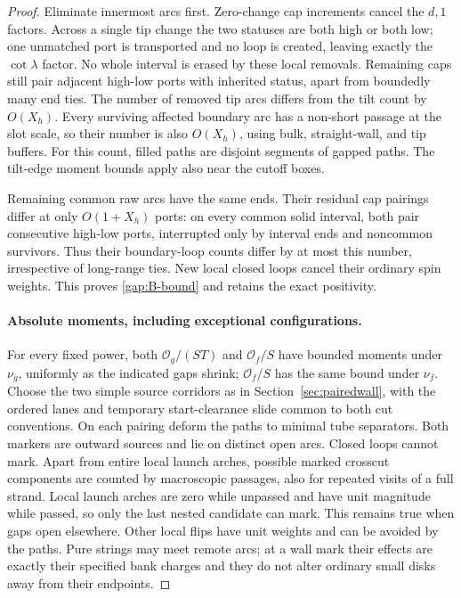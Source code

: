 \begin{proof}
Eliminate innermost arcs first.  Zero-change cap increments cancel the
$d,1$ factors.  Across a single tip change the two statuses are both
high or both low; one unmatched port is transported and no loop is
created, leaving exactly the $\cot\lambda$ factor.  No whole interval
is erased by these local removals.  Remaining caps still pair adjacent
high-low ports with inherited status, apart from boundedly many end
ties.  The number of removed tip arcs differs from the tilt count by
$O(X_h)$.  Every surviving affected boundary arc has a non-short
passage at the slot scale, so their number is also $O(X_h)$, using
bulk, straight-wall, and tip buffers.  For this count, filled paths
are disjoint segments of gapped paths.  The tilt-edge moment bounds
apply also near the cutoff boxes.

Remaining common raw arcs have the same ends.  Their residual cap
pairings differ at only $O(1+X_h)$ ports: on every common solid
interval, both pair consecutive high-low ports, interrupted only by
interval ends and noncommon survivors.  Thus their boundary-loop
counts differ by at most this number, irrespective of long-range
ties.  New local closed loops cancel their ordinary spin weights.
This proves \eqref{gap:B-bound} and retains the exact positivity.

\paragraph{Absolute moments, including exceptional configurations.}
For every fixed power, both $\mathcal O_g/(ST)$ and $\mathcal O_f/S$
have bounded moments under $\nu_g$, uniformly as the indicated gaps
shrink; $\mathcal O_f/S$ has the same bound under $\nu_f$.
Choose the two simple source corridors as in
Section~\ref{sec:pairedwall}, with the ordered lanes and temporary
start-clearance slide common to both cut conventions.  On each
pairing deform the paths to minimal tube separators.  Both markers
are outward sources and lie on distinct open arcs.  Closed loops
cannot mark.  Apart from entire local launch arches, possible marked
crosscut components are counted by macroscopic passages, also for
repeated visits of a full strand.  Local launch arches are zero while
unpassed and have unit magnitude while passed, so only the last nested
candidate can mark.  This remains true when gaps open elsewhere.
Other local flips have unit weights and can be avoided by the paths.
Pure strings may meet remote arcs; at a wall mark their effects are
exactly their specified bank charges and they do not alter ordinary
small disks away from their endpoints.


\end{proof}
